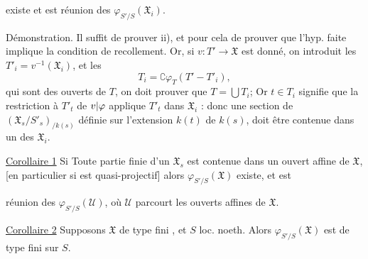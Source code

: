 existe et est réunion des $\varphi_{S'/S}(\mathfrak X_i)$.

Démonstration. Il suffit de prouver ii), et pour cela de prouver
que l'hyp. faite implique la condition de recollement. Or,
si $v:T'\to\mathfrak X$ est donné, on introduit les
$T'_i=v^{-1}(\mathfrak X_i)$, \deleted{$\unsure{-}$} et les
\[
T_i=\complement\varphi_T(T'-T'_i),
\]
qui sont des ouverts de $T$, on doit prouver que $T=\bigcup T_i$;
Or $t\in T_i$ signifie que la restriction à $T'_t$ de $v|\varphi$ applique
$T'_t$ dans $\mathfrak X_i$ : donc une section de
$(\mathfrak X_s/S'_s)_{/k(s)}$ définie sur l'extension $k(t)$ de $k(s)$,
doit être contenue dans un des $\mathfrak X_i$.

\uline{Corollaire 1} Si Toute partie  finie
 d'un $\mathfrak X_s$ est contenue
dans un ouvert affine de $\mathfrak X$, 
[en particulier si   est
quasi-projectif] alors $\varphi_{S'/S}(\mathfrak X)$ existe, et est

réunion des $\varphi_{S'/S}(\mathcal U)$, où $\mathcal U$ parcourt les
ouverts affines de $\mathfrak X$.

\uline{Corollaire 2} Supposons 
$\mathfrak X$ de type fini , et $S$ loc. noeth.
Alors $\varphi_{S'/S}(\mathfrak X)$ est de type fini sur $S$.

